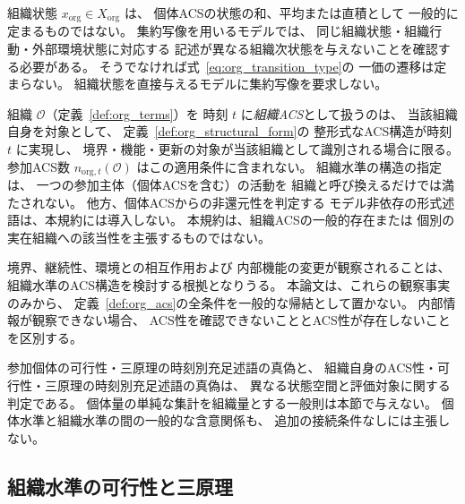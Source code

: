 \begin{remark}[組織状態と遷移の一価性]
\label{rem:org_state_closure}
組織状態 $x_{\mathrm{org}}\in X_{\mathrm{org}}$ は、
個体ACSの状態の和、平均または直積として
一般的に定まるものではない。
集約写像を用いるモデルでは、
同じ組織状態・組織行動・外部環境状態に対応する
記述が異なる組織次状態を与えないことを確認する必要がある。
そうでなければ式~\eqref{eq:org_transition_type}の
一価の遷移は定まらない。
組織状態を直接与えるモデルに集約写像を要求しない。
\end{remark}

\begin{definition}[組織ACSの記述的適用規約]
\label{def:org_acs}
組織 $\mathcal O$（定義~\ref{def:org_terms}）を
時刻 $t$ に\emph{組織ACS}として扱うのは、
当該組織自身を対象として、
定義~\ref{def:org_structural_form}の
整形式なACS構造が時刻 $t$ に実現し、
境界・機能・更新の対象が当該組織として識別される場合に限る。
参加ACS数 $n_{\mathrm{org},t}(\mathcal O)$ はこの適用条件に含まれない。
組織水準の構造の指定は、
一つの参加主体（個体ACSを含む）の活動を
組織と呼び換えるだけでは満たされない。
他方、個体ACSからの非還元性を判定する
モデル非依存の形式述語は、本規約には導入しない。
本規約は、組織ACSの一般的存在または
個別の実在組織への該当性を主張するものではない。
\end{definition}

\begin{remark}[成立と観察による判定]
\label{rem:org_acs_observability}
境界、継続性、環境との相互作用および
内部機能の変更が観察されることは、
組織水準のACS構造を検討する根拠となりうる。
本論文は、これらの観察事実のみから、
定義~\ref{def:org_acs}の全条件を一般的な帰結として置かない。
内部情報が観察できない場合、
ACS性を確認できないこととACS性が存在しないことを区別する。
\end{remark}

\begin{remark}[個体水準と組織水準の判定の区別]
\label{rem:org_individual_nonimplication}
参加個体の可行性・三原理の時刻別充足述語の真偽と、
組織自身のACS性・可行性・三原理の時刻別充足述語の真偽は、
異なる状態空間と評価対象に関する判定である。
個体量の単純な集計を組織量とする一般則は本節で与えない。
個体水準と組織水準の間の一般的な含意関係も、
追加の接続条件なしには主張しない。
\end{remark}

\subsection{組織水準の可行性と三原理}
\label{subsec:org_viability}

